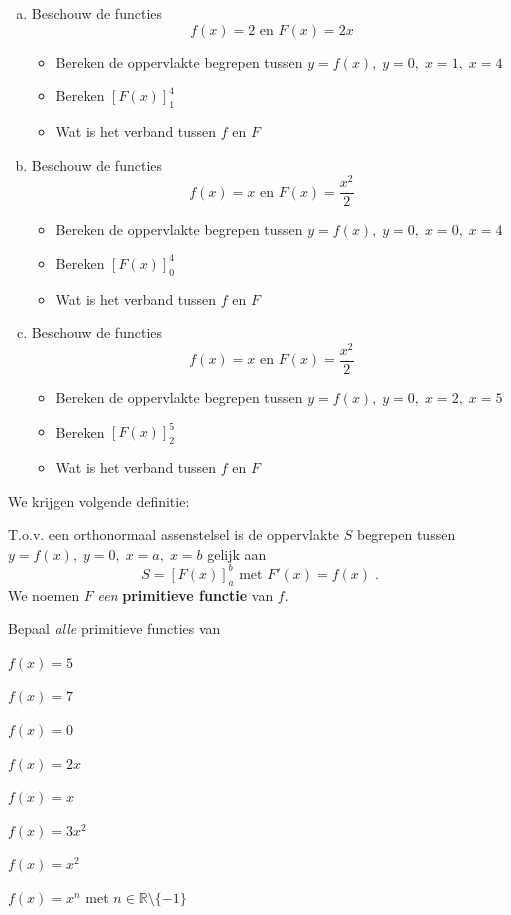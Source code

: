\documentclass[a4paper,12pt, twoside]{article}
\begin{document}
\begin{oefening}
\begin{enumerate}[(a)]
  \item Beschouw de functies
  $$f(x)=2 \mbox{ en } F(x)=2x$$
  \begin{itemize}
    \item Bereken de oppervlakte begrepen tussen $y=f(x),\;y=0,\;x=1,\;x=4$
    \item Bereken $[F(x)]_1^4$
    \item Wat is het verband tussen $f$ en $F$
  \end{itemize}
  \item Beschouw de functies
  $$f(x)=x \mbox{ en } F(x)=\dfrac{x^2}{2}$$
  \begin{itemize}
    \item Bereken de oppervlakte begrepen tussen $y=f(x),\;y=0,\;x=0,\;x=4$
    \item Bereken $[F(x)]_0^4$
    \item Wat is het verband tussen $f$ en $F$
  \end{itemize}
  \item Beschouw de functies
  $$f(x)=x \mbox{ en } F(x)=\dfrac{x^2}{2}$$
  \begin{itemize}
    \item Bereken de oppervlakte begrepen tussen $y=f(x),\;y=0,\;x=2,\;x=5$
    \item Bereken $[F(x)]_2^5$
    \item Wat is het verband tussen $f$ en $F$
  \end{itemize}
\end{enumerate}
\end{oefening}

We krijgen volgende definitie:

T.o.v. een orthonormaal assenstelsel is de oppervlakte $S$ begrepen tussen $y=f(x),\;y=0,\;x=a,\;x=b$ gelijk aan
$$S=\left[F(x)\right]_a^b \mbox{ met } F'(x)=f(x)\;.$$ We noemen $F$ {\em een} {\bf primitieve functie} van $f$.

\begin{oefening}
Bepaal {\em alle} primitieve functies van
\begin{exlist}{2}
  \item $f(x)=5$
  \item $f(x)=7$
  \item $f(x)=0$
  \item $f(x)=2x$
  \item $f(x)=x$
  \item $f(x)=3x^2$
  \item $f(x)=x^2$
  \item $f(x)=x^n$ met $n\in\mathbb{R}\setminus\{-1\}$
\end{exlist}
\end{oefening}
\end{document}
